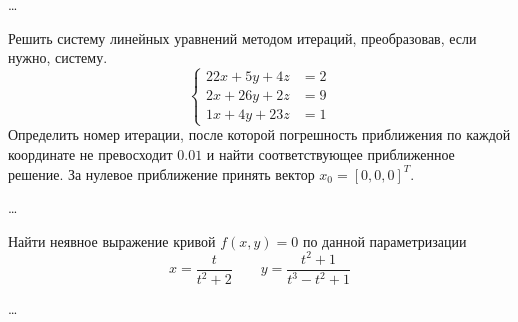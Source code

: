 \ldots


\begin{problem}
    Решить систему линейных уравнений методом итераций, преобразовав, если
    нужно, систему.
    \begin{equation*}
        \begin{cases}
            22x + 5y + 4z &= 2\\
            2x + 26y + 2z &= 9\\
            1x + 4y + 23z &= 1
        \end{cases}
    \end{equation*}
    Определить номер итерации, после которой погрешность приближения по каждой
    координате не превосходит $0.01$ и найти соответствующее приближенное
    решение. За нулевое приближение принять вектор $x_0 = [0, 0, 0]^T$.
\end{problem}

\ldots


\begin{problem}
    Найти неявное выражение кривой $f(x, y) = 0$ по данной параметризации
    \begin{equation*}
        x = \frac{t}{t^2 + 2}
        \qquad
        y = \frac{t^2 + 1}{t^3 - t^2 + 1}
    \end{equation*}
\end{problem}

\ldots